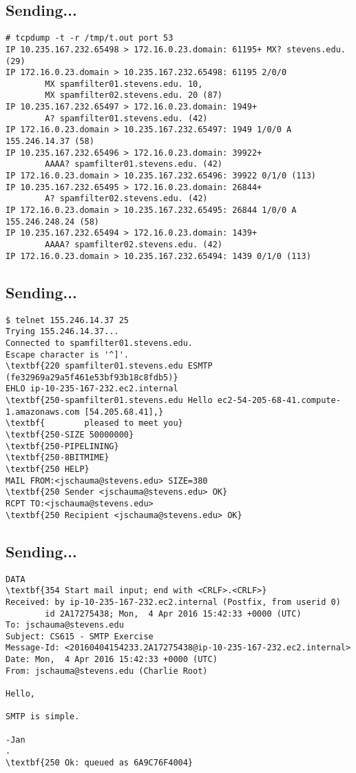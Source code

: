 \documentclass[xga]{xdvislides}
\begin{document}
\subsection{Sending...}
\begin{verbatim}
# tcpdump -t -r /tmp/t.out port 53
IP 10.235.167.232.65498 > 172.16.0.23.domain: 61195+ MX? stevens.edu. (29)
IP 172.16.0.23.domain > 10.235.167.232.65498: 61195 2/0/0
        MX spamfilter01.stevens.edu. 10,
        MX spamfilter02.stevens.edu. 20 (87)
IP 10.235.167.232.65497 > 172.16.0.23.domain: 1949+
        A? spamfilter01.stevens.edu. (42)
IP 172.16.0.23.domain > 10.235.167.232.65497: 1949 1/0/0 A 155.246.14.37 (58)
IP 10.235.167.232.65496 > 172.16.0.23.domain: 39922+
        AAAA? spamfilter01.stevens.edu. (42)
IP 172.16.0.23.domain > 10.235.167.232.65496: 39922 0/1/0 (113)
IP 10.235.167.232.65495 > 172.16.0.23.domain: 26844+
        A? spamfilter02.stevens.edu. (42)
IP 172.16.0.23.domain > 10.235.167.232.65495: 26844 1/0/0 A 155.246.248.24 (58)
IP 10.235.167.232.65494 > 172.16.0.23.domain: 1439+
        AAAA? spamfilter02.stevens.edu. (42)
IP 172.16.0.23.domain > 10.235.167.232.65494: 1439 0/1/0 (113)
\end{verbatim}

\subsection{Sending...}
\begin{Verbatim}
$ telnet 155.246.14.37 25
Trying 155.246.14.37...
Connected to spamfilter01.stevens.edu.
Escape character is '^]'.
\textbf{220 spamfilter01.stevens.edu ESMTP (fe32969a29a5f461e53bf93b18c8fdb5)}
EHLO ip-10-235-167-232.ec2.internal
\textbf{250-spamfilter01.stevens.edu Hello ec2-54-205-68-41.compute-1.amazonaws.com [54.205.68.41],}
\textbf{        pleased to meet you}
\textbf{250-SIZE 50000000}
\textbf{250-PIPELINING}
\textbf{250-8BITMIME}
\textbf{250 HELP}
MAIL FROM:<jschauma@stevens.edu> SIZE=380
\textbf{250 Sender <jschauma@stevens.edu> OK}
RCPT TO:<jschauma@stevens.edu>
\textbf{250 Recipient <jschauma@stevens.edu> OK}
\end{Verbatim}

\subsection{Sending...}
\begin{Verbatim}
DATA
\textbf{354 Start mail input; end with <CRLF>.<CRLF>}
Received: by ip-10-235-167-232.ec2.internal (Postfix, from userid 0)
        id 2A17275438; Mon,  4 Apr 2016 15:42:33 +0000 (UTC)
To: jschauma@stevens.edu
Subject: CS615 - SMTP Exercise
Message-Id: <20160404154233.2A17275438@ip-10-235-167-232.ec2.internal>
Date: Mon,  4 Apr 2016 15:42:33 +0000 (UTC)
From: jschauma@stevens.edu (Charlie Root)

Hello,

SMTP is simple.

-Jan
.
\textbf{250 Ok: queued as 6A9C76F4004}
\end{Verbatim}
\end{document}
